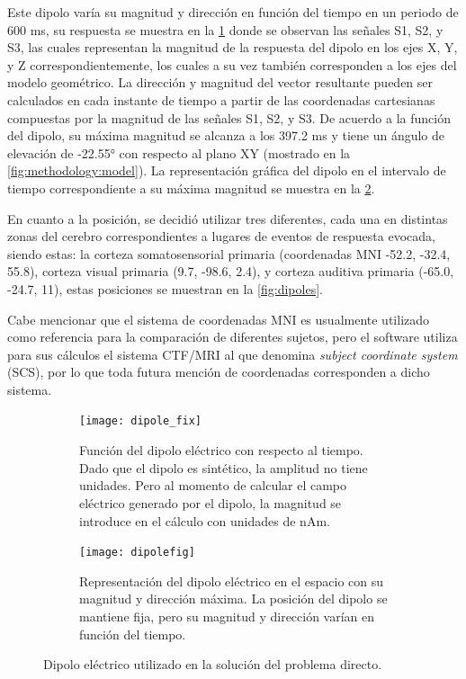 Este dipolo varía su magnitud y dirección en función del tiempo en un periodo de 600 ms, su respuesta se muestra en la \cref{fig:methodology:dipole} donde se observan las señales S1, S2, y S3, las cuales representan la magnitud de la respuesta del dipolo en los ejes X, Y, y Z correspondientemente, los cuales a su vez también corresponden a los ejes del modelo geométrico.
La dirección y magnitud del vector resultante pueden ser calculados en cada instante de tiempo a partir de las coordenadas cartesianas compuestas por la magnitud de las señales S1, S2, y S3.
De acuerdo a la función del dipolo, su máxima magnitud se alcanza a los 397.2 ms y tiene un ángulo de elevación de -22.55° con respecto al plano XY (mostrado en la \cref{fig:methodology:model}). 
La representación gráfica del dipolo en el intervalo de tiempo correspondiente a su máxima magnitud se muestra en la \cref{fig:methodology:dipolefig}.

En cuanto a la posición, se decidió utilizar tres diferentes, cada una en distintas zonas del cerebro correspondientes a lugares de eventos de respuesta evocada, siendo estas: la corteza somatosensorial primaria (coordenadas MNI -52.2, -32.4, 55.8), corteza visual primaria (9.7, -98.6, 2.4), y corteza auditiva primaria (-65.0, -24.7, 11), estas posiciones se muestran en la \cref{fig:dipoles}.

Cabe mencionar que el sistema de coordenadas MNI es usualmente utilizado como referencia para la comparación de diferentes sujetos, pero el software utiliza para sus cálculos el sistema CTF/MRI al que denomina \emph{subject coordinate system} (SCS), por lo que toda futura mención de coordenadas corresponden a dicho sistema.

\begin{figure}[tbp]
	\centering
	\begin{subfigure}[t]{0.8\textwidth}
		\texttt{[image: dipole\_fix]}
		\caption{Función del dipolo eléctrico con respecto al tiempo. Dado que el dipolo es sintético, la amplitud no tiene unidades. Pero al momento de calcular el campo eléctrico generado por el dipolo, la magnitud se introduce en el cálculo con unidades de nAm.}
		\label{fig:methodology:dipole}
	\end{subfigure}
	\vspace{0.5cm} %
	\begin{subfigure}[t]{0.8\textwidth}
		\texttt{[image: dipolefig]}
		\caption{Representación del dipolo eléctrico en el espacio con su magnitud y dirección máxima. La posición del dipolo se mantiene fija, pero su magnitud y dirección varían en función del tiempo. }
		\label{fig:methodology:dipolefig}
	\end{subfigure}
	\caption{Dipolo eléctrico utilizado en la solución del problema directo.}
	\label{fig:methodology:dipolefun}
\end{figure}

